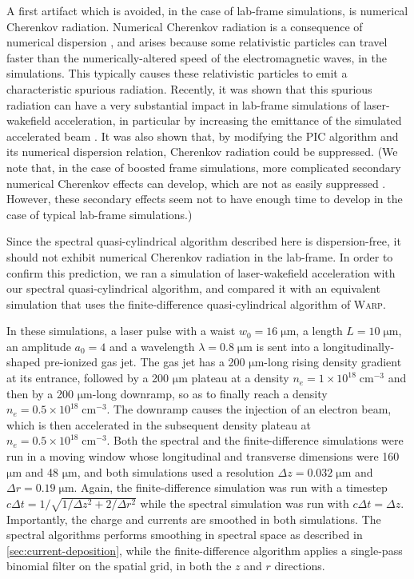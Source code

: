 \documentclass[1p,times,authoryear]{elsarticle}
\begin{document}
A first artifact which is avoided, in the case of lab-frame
simulations, is numerical Cherenkov radiation. Numerical
Cherenkov radiation is a consequence of numerical dispersion
\citep{GodfreyJCP1974}, and arises because some relativistic particles can
travel faster than the numerically-altered speed of the
electromagnetic waves, in the simulations. This typically causes these
relativistic particles to emit a characteristic spurious
radiation. Recently, it was shown that this spurious radiation
can have a very substantial impact in
lab-frame simulations of laser-wakefield acceleration, 
in particular by increasing the
emittance of the simulated accelerated beam \citep{LehePRSTAB2013}. It
was also shown that, by modifying the PIC algorithm and its
numerical dispersion relation, Cherenkov radiation could be
suppressed. (We note that, in the case of boosted frame simulations,
more complicated secondary numerical Cherenkov effects can develop, 
which are not as easily suppressed \citep{XuJCP2013,YuJCP2014,YuCPC2015,
GodfreyIEEE2014,GodfreyJCP2014}. However, these secondary effects seem not to
have enough time to develop in the case of typical lab-frame simulations.) 

Since the spectral quasi-cylindrical algorithm described here is
dispersion-free, it should not exhibit numerical Cherenkov
radiation in the lab-frame. In order to confirm this prediction, we ran a simulation of
laser-wakefield acceleration with our spectral quasi-cylindrical
algorithm, and compared it with an equivalent simulation that uses 
the finite-difference quasi-cylindrical algorithm of \textsc{Warp}.

In these simulations, a laser pulse with a waist $w_0 = 16\;\mathrm{\mu m}$,
a length $L=10\;\mathrm{\mu m}$, an amplitude $a_0 = 4$ and a
wavelength $\lambda = 0.8\;\mathrm{\mu m}$
is sent into a longitudinally-shaped pre-ionized gas jet. The gas jet
has a 200 $\mathrm{\mu m}$-long rising density gradient at its
entrance, followed by a 200 $\mathrm{\mu m}$ plateau at a density $n_e = 1 \times
 10^{18}\;\mathrm{cm^{-3}}$ and then by a 200 $\mathrm{\mu m}$-long
 downramp, so as to finally reach a density $n_e = 0.5 \times
 10^{18}\;\mathrm{cm^{-3}}$. The downramp causes the injection of an
 electron beam, which is then accelerated in the subsequent density 
plateau at $n_e = 0.5 \times 10^{18}\;\mathrm{cm^{-3}}$. 
Both the spectral and the finite-difference simulations were run in a moving
window whose longitudinal and transverse dimensions were 160 $\mathrm{\mu
  m}$ and 48 $\mathrm{\mu m}$, and both simulations used a resolution
$\Delta z = 0.032 \; \mathrm{\mu m}$ and $\Delta r = 0.19 \; \mathrm{\mu
  m}$. Again, the finite-difference simulation was run with a timestep
$c\Delta t = 1/\sqrt{1/\Delta z^2 + 2/\Delta r^2}$ while the spectral
simulation was run with $c\Delta t = \Delta z$. Importantly, the
charge and currents are smoothed in both
simulations. The spectral algorithms performs smoothing in spectral
space as described in \cref{sec:current-deposition}, while the finite-difference
algorithm applies a single-pass binomial filter on the spatial grid,
in both the $z$ and $r$ directions.
\end{document}

